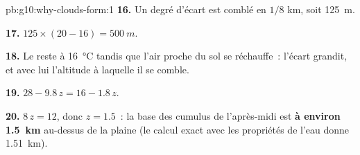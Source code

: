 \begin{solution}{pb:g10:why-clouds-form:1}
\textbf{16.} Un degré d'écart est comblé en $1/8$ km, soit \qty{125}{m}.

\textbf{17.} $125 \times (20 - 16) = \qty{500}{m}$.

\textbf{18.} Le  reste à \qty{16}{\degreeCelsius} tandis que
l'air proche du sol se réchauffe~: l'écart grandit, et avec lui l'altitude
à laquelle il se comble.

\textbf{19.} $28 - 9.8\,z = 16 - 1.8\,z$.

\textbf{20.} $8\,z = 12$, donc $z = 1.5$~: la base des cumulus de
l'après-midi est \textbf{à environ \qty{1.5}{km}} au-dessus de la plaine (le
calcul exact avec les propriétés de l'eau donne \qty{1.51}{km}).
\end{solution}
